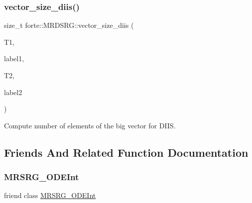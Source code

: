 \subsubsection{\texorpdfstring{vector\+\_\+size\+\_\+diis()}{vector\_size\_diis()}}
{\footnotesize\ttfamily size\+\_\+t forte\+::\+M\+R\+D\+S\+R\+G\+::vector\+\_\+size\+\_\+diis (\begin{DoxyParamCaption}\item[{Blocked\+Tensor \&}]{T1,  }\item[{const std\+::vector$<$ std\+::string $>$ \&}]{label1,  }\item[{Blocked\+Tensor \&}]{T2,  }\item[{const std\+::vector$<$ std\+::string $>$ \&}]{label2 }\end{DoxyParamCaption})\hspace{0.3cm}{\ttfamily [protected]}}



Compute number of elements of the big vector for D\+I\+IS. 



\subsection{Friends And Related Function Documentation}
\mbox{\label{classforte_1_1_m_r_d_s_r_g_a29cb5d0b5db35267b86f513840939b43}} 
\subsubsection{\texorpdfstring{M\+R\+S\+R\+G\+\_\+\+O\+D\+E\+Int}{MRSRG\_ODEInt}}
{\footnotesize\ttfamily friend class \mbox{\hyperlink{classforte_1_1_m_r_s_r_g___o_d_e_int}{M\+R\+S\+R\+G\+\_\+\+O\+D\+E\+Int}}\hspace{0.3cm}{\ttfamily [friend]}}

\mbox{\label{classforte_1_1_m_r_d_s_r_g_a03dd97c193a72dad6dcc76fbdd2df331}} 
